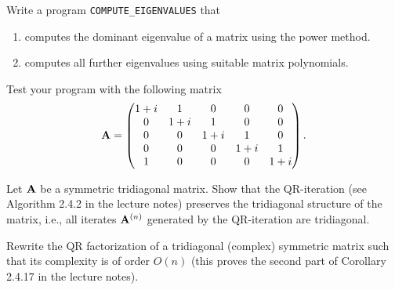 
\begin{Sheet}
  \label{sheet4}



  \begin{Problem}
  	Write a program \texttt{COMPUTE\_EIGENVALUES} that
  	\begin{enumerate}
  		\item computes the dominant eigenvalue of a matrix using the power method.
  		\item computes all further eigenvalues using suitable matrix polynomials.
  	\end{enumerate}
  	Test your program with the following matrix
  	\begin{gather*}
  	  \mathbf A =
  	  \begin{pmatrix}
  	  1+i & 1 & 0 & 0 & 0\\
  	  0 & 1+i & 1 & 0 & 0\\
  	  0 & 0 & 1+i & 1 & 0\\
  	  0 & 0 & 0 & 1+i & 1\\
  	  1 & 0 & 0 & 0 & 1+i
  	  \end{pmatrix}.
  	\end{gather*}
  	
  \end{Problem}

  \begin{Problem}
	Let $\mathbf A$ be a symmetric tridiagonal matrix. Show that the
	QR-iteration (see Algorithm 2.4.2 in the lecture notes) preserves
	the tridiagonal structure of the matrix, i.e., all iterates
	$\mathbf A^{(n)}$ generated by the QR-iteration are tridiagonal.
\end{Problem}


\begin{Problem}
	Rewrite the QR factorization of a tridiagonal (complex) symmetric
	matrix such that its complexity is of order $O(n)$ (this proves
	the second part of Corollary 2.4.17 in the lecture notes).
\end{Problem}

\end{Sheet}


